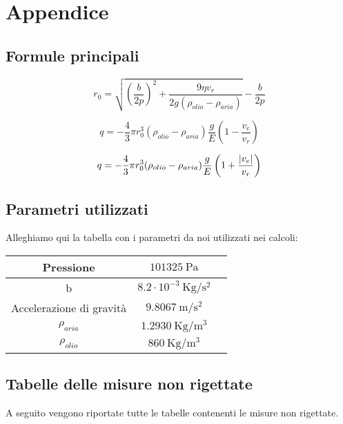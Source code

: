 \section{Appendice}
\subsection{Formule principali}
    \begin{equation}
    \label{raggio}
        r_0 = \sqrt{\left( \frac{b}{2p} \right)^2 + \frac{9\eta v_r}{2g(\rho_{olio} - \rho_{aria})}} -  \frac{b}{2p}
    \end{equation}

    \begin{equation}
    \label{caricapos}
        q = -\frac{4}{3}\pi r_0^3 (\rho_{olio} - \rho_{aria}) \frac{g}{E}\left( 1 - \frac{v_e}{v_r} \right)
    \end{equation}

    \begin{equation}
    \label{caricaneg}
        q = -\frac{4}{3}\pi r_0^3 (\rho_{olio} - \rho_{aria}) \frac{g}{E}\left( 1 + \frac{\abs{v_e}}{v_r} \right)
    \end{equation}
\subsection{Parametri utilizzati}
Alleghiamo qui la tabella con i parametri da noi utilizzati nei calcoli:
\renewcommand{\arraystretch}{1.3}
    \begin{center}
        \begin{tabular}{ |c|c|c| }
             \hline
             Pressione & $101325~\mathrm{Pa}$ \\
             \hline
             b & $8.2\cdot10^{-3}~\mathrm{Kg/s^2}$ \\
             \hline
             Accelerazione di gravità & $9.8067~\mathrm{m/s^2}$ \\ 
             \hline
             $\rho_{aria}$ & $1.2930~\mathrm{Kg/m^3}$ \\ 
             \hline
             $\rho_{olio}$ & $860~\mathrm{Kg/m^3}$ \\ 
             \hline
        \end{tabular}
    \end{center}
    \subsection{Tabelle delle misure non rigettate}
    A seguito vengono riportate tutte le tabelle contenenti le misure non rigettate.
        
        
        
